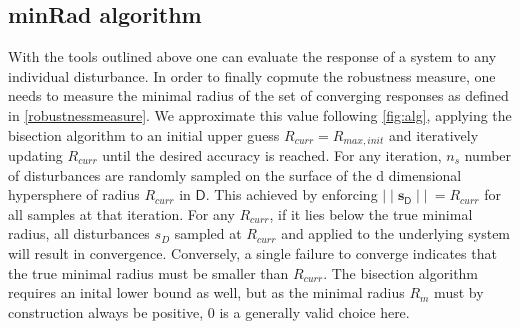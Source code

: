 



\subsection{minRad algorithm} \label{minrad}
    

    With the tools outlined above one can evaluate the response of a system to any individual disturbance. In order to finally copmute the robustness measure, one needs to measure the minimal radius of the set of converging responses as defined in \ref{robustnessmeasure}. We approximate this value following \ref{fig:alg}, applying the bisection algorithm to an initial upper guess $R_{curr} =  R_{max,init}$ and iteratively updating $R_{curr}$ until the desired accuracy is reached. For any iteration, $n_{s}$ number of disturbances are randomly sampled on the surface of the d dimensional hypersphere of radius $R_{curr}$ in $\mathsf{D}$. This achieved by enforcing $\mid\mid \mathbf{s}_{\mathsf{D}}\mid\mid\ = R_{curr}$ for all samples at that iteration. For any $R_{curr}$, if it lies below the true minimal radius, all disturbances ${s_D}$ sampled at $R_{curr}$ and applied to the underlying system will result in convergence. Conversely, a single failure to converge indicates that the true minimal radius must be smaller than $R_{curr}$. The bisection algorithm requires an inital lower bound as well, but as the minimal radius $R_m$ must by construction always be positive, 0 is a generally valid choice here. 

